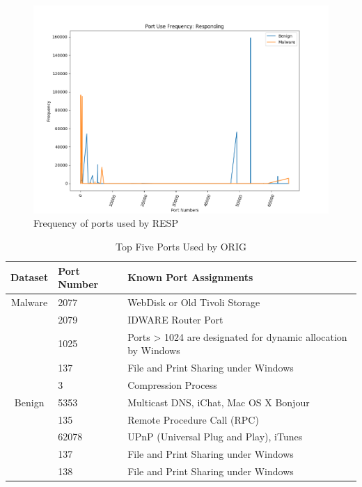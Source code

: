 \begin{figure}[htb]
	\centering
	\includegraphics[width=1\textwidth]{images/resp-port-freq.png}
	\caption{Frequency of ports used by RESP} 
	\label{fig:resp-port-freq}
\end{figure}

\begin{table}[!htb]
	\caption{Top Five Ports Used by ORIG\label{tab:5}}
	\begin{center}
		\begin{tabular}{c|p{}|p{}}\hline\hline
			Dataset & Port Number & \multicolumn{1}{l}{Known Port Assignments} \\ \hline
			Malware & 2077 & WebDisk or Old Tivoli Storage \\
			& 2079	&  IDWARE Router Port\\
			& 1025	&  Ports > 1024 are designated for dynamic allocation by Windows\\
			& 137	&  File and Print Sharing under Windows\\
			& 3 &  Compression Process \\ \hline
			Benign & 5353  &  Multicast DNS, iChat, Mac OS X Bonjour\\
			& 135 &  Remote Procedure Call (RPC)\\
			& 62078 &  UPnP (Universal Plug and Play), iTunes\\
			& 137 &  File and Print Sharing under Windows\\
			& 138 &  File and Print Sharing under Windows\\
			\hline\hline
		\end{tabular}
	\end{center}
\end{table}

